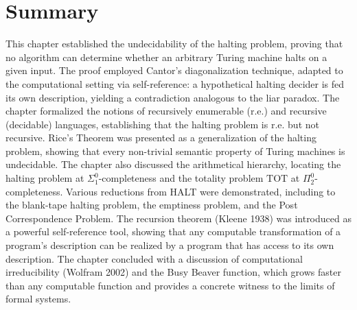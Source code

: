 \section{Summary}
\label{sec:halting:summary}

This chapter established the undecidability of the halting problem, proving that no algorithm can determine whether an arbitrary Turing machine halts on a given input. The proof employed Cantor's diagonalization technique, adapted to the computational setting via self-reference: a hypothetical halting decider is fed its own description, yielding a contradiction analogous to the liar paradox. The chapter formalized the notions of recursively enumerable (r.e.) and recursive (decidable) languages, establishing that the halting problem is r.e. but not recursive. Rice's Theorem was presented as a generalization of the halting problem, showing that every non-trivial semantic property of Turing machines is undecidable. The chapter also discussed the arithmetical hierarchy, locating the halting problem at $\Sigma^0_1$-completeness and the totality problem $\text{TOT}$ at $\Pi^0_2$-completeness. Various reductions from HALT were demonstrated, including to the blank-tape halting problem, the emptiness problem, and the Post Correspondence Problem. The recursion theorem (Kleene 1938) was introduced as a powerful self-reference tool, showing that any computable transformation of a program's description can be realized by a program that has access to its own description. The chapter concluded with a discussion of computational irreducibility (Wolfram 2002) and the Busy Beaver function, which grows faster than any computable function and provides a concrete witness to the limits of formal systems.

